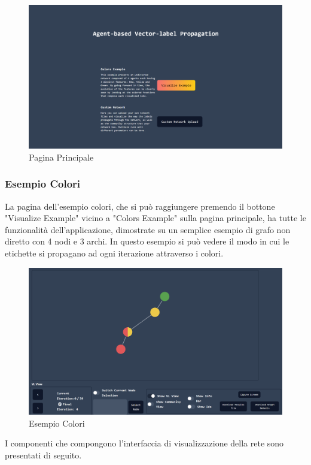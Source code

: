 \documentclass[a4paper,12pt]{report}
\begin{document}
			\begin{center}
			\begin{figure}[H]
			\centering
			\includegraphics[width=0.9\linewidth,keepaspectratio]{paginaprincipale}
			\caption{Pagina Principale}
			\end{figure}
			\end{center}

			\subsubsection{Esempio Colori}

			La pagina dell'esempio colori, che si può raggiungere premendo il bottone "Visualize Example" vicino a "Colors Example" sulla pagina principale, ha tutte le funzionalità dell'applicazione, dimostrate su un semplice esempio di grafo non diretto con 4 nodi e 3 archi. In questo esempio si può vedere il modo in cui le etichette si propagano ad ogni iterazione attraverso i colori. 


			\begin{center}
			\begin{figure}[H]
			\centering
			\includegraphics[width=0.9\linewidth,keepaspectratio]{colorsexample}	
			\caption{Esempio Colori}
			\end{figure}
			\end{center}
			I componenti che compongono l'interfaccia di visualizzazione della rete sono presentati di seguito.
\end{document}
